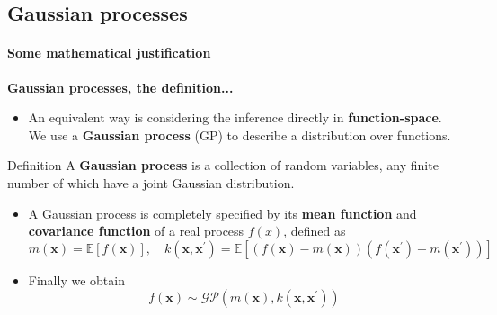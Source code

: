 \subsection{Gaussian processes}
\begin{frame}{\insertsubsection}
    \framesubtitle{Some mathematical justification}

    \textcolor{UniGold}{\textbf{Gaussian processes, the definition...}}

    \begin{itemize}
        \item An equivalent way is considering the inference directly in \textcolor{UniOrange}{\textbf{function-space}}. We use a \textcolor{UniOrange}{\textbf{Gaussian process}} (GP) to describe a distribution over functions.
    \end{itemize}

    \begin{block}{Definition}
        A \textcolor{UniBlue}{\textbf{Gaussian process}} is a collection of random variables, any finite number of which have a joint Gaussian distribution.
    \end{block}

    \begin{itemize}
        \item A Gaussian process is completely specified by its \textcolor{UniOrange}{\textbf{mean function}} and \textcolor{UniOrange}{\textbf{covariance function}} of a real process $f (x)$, defined as
        \begin{equation*}
        m(\mathbf{x}) =\mathbb{E}[f(\mathbf{x})], \quad k\left(\mathbf{x}, \mathbf{x}^{\prime}\right) =\mathbb{E}\left[(f(\mathbf{x})-m(\mathbf{x}))\left(f\left(\mathbf{x}^{\prime}\right)-m\left(\mathbf{x}^{\prime}\right)\right)\right]
        \end{equation*}

        \item Finally we obtain
        \begin{equation*}
            f(\mathbf{x}) \sim \mathcal{G} \mathcal{P}\left(m(\mathbf{x}), k\left(\mathbf{x}, \mathbf{x}^{\prime}\right)\right)
        \end{equation*}
    \end{itemize}
\end{frame}


